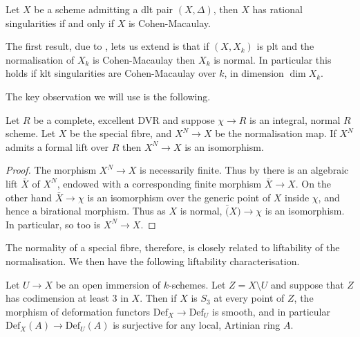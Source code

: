 \documentclass[a4paper,12pt]{book}
\begin{document}
\begin{theorem}
	Let $X$ be a scheme admitting a dlt pair $(X,\Delta)$, then $X$ has rational singularities if and only if $X$ is Cohen-Macaulay.
\end{theorem}

The first result, due to \cite{}, lets us extend \cite{} is that if $(X,X_{k})$ is plt and the normalisation of $X_{k}$ is Cohen-Macaulay then $X_{k}$ is normal. In particular this holds if klt singularities are Cohen-Macaulay over $k$, in dimension $\dim X_{k}$.

The key observation we will use is the following.

\begin{lemma} \label{lift-lemma-1}
	
	Let $R$ be a complete, excellent DVR and suppose $\chi \to R$ is an integral, normal $R$ scheme. Let $X$ be the special fibre, and $X^{N} \to X$ be the normalisation map. If $X^{N}$ admits a formal lift over $R$ then $X^{N} \to X$ is an isomorphism.
	
	\end{lemma}

\begin{proof}
	The morphism $X^{N} \to X$ is necessarily finite. Thus by \cite[Tag 09ZT]{stacks-project} there is an algebraic lift $\bar{X}$ of $X^{N}$, endowed with a corresponding finite morphism $\bar{X} \to X$. On the other hand $\bar{X} \to \chi$ is an isomorphism over the generic point of $X$ inside $\chi$, and hence a birational morphism. Thus as $X$ is normal, $\bar(X)\to \chi$ is an isomorphism. In particular, so too is $X^{N} \to X$.
\end{proof}

The normality of a special fibre, therefore, is closely related to liftability of the normalisation. We then have the following liftability characterisation.

\begin{lemma}\cite[Lemma A.23]{zdanowicz2018liftability}\label{lift-lemma-2}
	
	Let $U \to X$ be an open immersion of $k$-schemes. Let $Z=X \setminus U$ and suppose that $Z$ has codimension at least $3$ in $X$. Then if $X$ is $S_{3}$ at every point of $Z$, the morphism of deformation functors $\text{Def}_{X} \to \text{Def}_{U}$ is smooth, and in particular $\text{Def}_{X}(A) \to \text{Def}_{U}(A)$ is surjective for any local, Artinian ring $A$.  
	
	\end{lemma}
\end{document}
